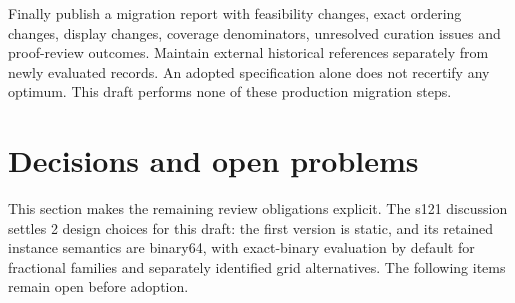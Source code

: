 Finally publish a migration report with feasibility changes, exact ordering changes, display changes, coverage denominators, unresolved curation issues and proof-review outcomes. Maintain external historical references separately from newly evaluated records. An adopted specification alone does not recertify any optimum. This draft performs none of these production migration steps.

\section{Decisions and open problems}\label{sec:open}
This section makes the remaining review obligations explicit. The s121 discussion settles 2 design choices for this draft: the first version is static, and its retained instance semantics are binary64, with exact-binary evaluation by default for fractional families and separately identified grid alternatives. The following items remain open before adoption.

